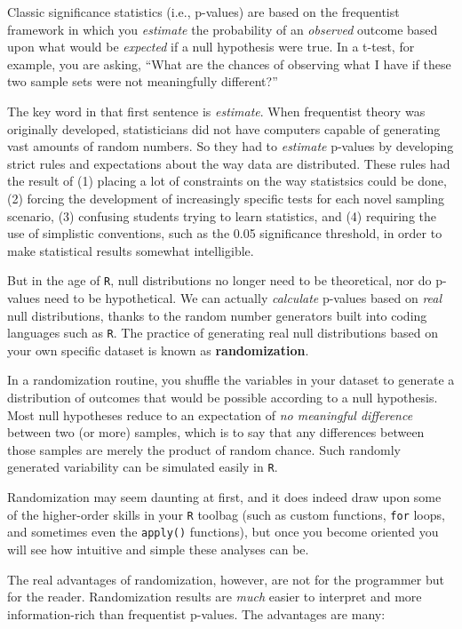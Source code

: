 \documentclass[
]{book}
\begin{document}
Classic significance statistics (i.e., p-values) are based on the frequentist framework in which you \emph{estimate} the probability of an \emph{observed} outcome based upon what would be \emph{expected} if a null hypothesis were true. In a t-test, for example, you are asking, ``What are the chances of observing what I have if these two sample sets were not meaningfully different?''

The key word in that first sentence is \emph{estimate}. When frequentist theory was originally developed, statisticians did not have computers capable of generating vast amounts of random numbers. So they had to \emph{estimate} p-values by developing strict rules and expectations about the way data are distributed. These rules had the result of (1) placing a lot of constraints on the way statistsics could be done, (2) forcing the development of increasingly specific tests for each novel sampling scenario, (3) confusing students trying to learn statistics, and (4) requiring the use of simplistic conventions, such as the 0.05 significance threshold, in order to make statistical results somewhat intelligible.

But in the age of \texttt{R}, null distributions no longer need to be theoretical, nor do p-values need to be hypothetical. We can actually \emph{calculate} p-values based on \emph{real} null distributions, thanks to the random number generators built into coding languages such as \texttt{R}. The practice of generating real null distributions based on your own specific dataset is known as \textbf{randomization}.

In a randomization routine, you shuffle the variables in your dataset to generate a distribution of outcomes that would be possible according to a null hypothesis. Most null hypotheses reduce to an expectation of \emph{no meaningful difference} between two (or more) samples, which is to say that any differences between those samples are merely the product of random chance. Such randomly generated variability can be simulated easily in \texttt{R}.

Randomization may seem daunting at first, and it does indeed draw upon some of the higher-order skills in your \texttt{R} toolbag (such as custom functions, \texttt{for} loops, and sometimes even the \texttt{apply()} functions), but once you become oriented you will see how intuitive and simple these analyses can be.

The real advantages of randomization, however, are not for the programmer but for the reader. Randomization results are \emph{much} easier to interpret and more information-rich than frequentist p-values. The advantages are many:
\end{document}
